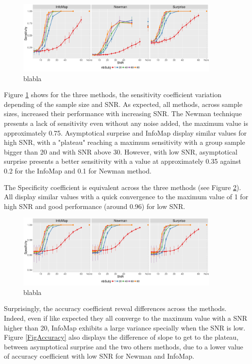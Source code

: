 \begin{figure}
\includegraphics[width=0.9\textwidth]{images/Simu_Sensitivity_LFRClick_paper.png}\caption{blabla}
\label{FigSensitivity}

\end{figure}

Figure \ref{FigSensitivity} shows
for the three methods, the sensitivity coefficient variation depending of the sample size and
SNR. As expected, all methods, across sample sizes, increased their performance with increasing SNR. The Newman technique presents a lack of sensitivity even without any noise added, the maximum value is approximately 0.75. Asymptotical surprise and InfoMap display similar values for high SNR, with a "plateau" reaching a maximum sensitivity with a group sample bigger than 20 and with SNR above 30. However, with low SNR, asymptotical surprise presents a better sensitivity  with a value at approximately 0.35 against 0.2 for the InfoMap and 0.1 for Newman method.

The Specificity coefficient is equivalent across the three methods (see Figure \ref{FigSpecificity}). All display similar values with a quick convergence to the maximum value of 1 for high SNR and good performance (around 0.96) for low SNR. 


\begin{figure}[h!]
\includegraphics[width=0.9\textwidth]{images/Simu_Spec_LFRClick_paper.png}
\caption{blabla}
\label{FigSpecificity}

\end{figure}

Surprisingly, the accuracy coefficient reveal differences across the methods. Indeed, even if like expected they all converge to the maximum value with a SNR higher than 20, InfoMap exhibits a large variance specially when the SNR is low. Figure \ref{FigAccuracy} also displays the difference of slope to get to the plateau, between asymptotical surprise and the two others methods, due to a lower value of accuracy coefficient with low SNR for Newman and InfoMap.


